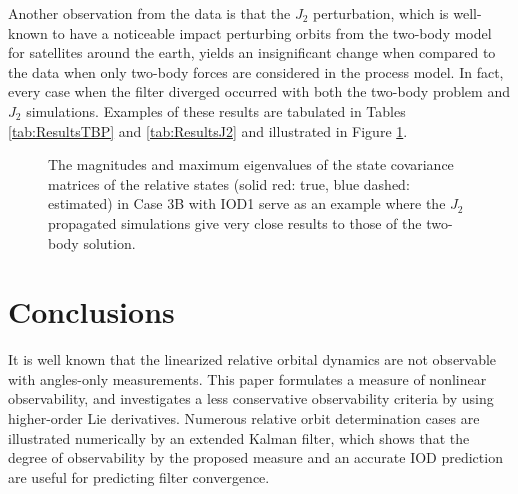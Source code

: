 \documentclass[letterpaper, paper,10pt]{AAS}		%
\begin{document}
Another observation from the data is that the $J_2$ perturbation, which is well-known to have a noticeable impact perturbing orbits from the two-body model for satellites around the earth, yields an insignificant change when compared to the data when only two-body forces are considered in the process model.
In fact, every case when the filter diverged occurred with both the two-body problem and $J_2$ simulations.
Examples of these results are tabulated in Tables \ref{tab:ResultsTBP} and \ref{tab:ResultsJ2} and illustrated in Figure \ref{fig:TBPvsJ2}.



\begin{figure}[h]
\centerline{
	\hfill
}
\centerline{
	\hfill
}
\caption{The magnitudes and maximum eigenvalues of the state covariance matrices of the relative states (solid red: true, blue dashed: estimated) in Case 3B with IOD1 serve as an example where the $J_2$ propagated simulations give very close results to those of the two-body solution.
}\label{fig:TBPvsJ2}
\end{figure}






\section{Conclusions}

It is well known that the linearized relative orbital dynamics are not observable with angles-only
measurements.
This paper formulates a measure of nonlinear observability, and investigates a less conservative observability criteria by using higher-order Lie derivatives.
Numerous relative orbit determination cases are illustrated numerically by an extended Kalman filter, which shows that the degree of observability by the proposed measure and an accurate IOD prediction are useful for predicting filter convergence.






\end{document}
